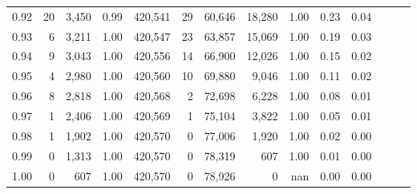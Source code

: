 \begin{tabular}{rrrrrrrrrrrrrr}
0.92 &     20 &  3,450 &  0.99 &  420,541 &       29 &  60,646 &  18,280 &  1.00 &  0.23 &      0.04 \\
0.93 &      6 &  3,211 &  1.00 &  420,547 &       23 &  63,857 &  15,069 &  1.00 &  0.19 &      0.03 \\
0.94 &      9 &  3,043 &  1.00 &  420,556 &       14 &  66,900 &  12,026 &  1.00 &  0.15 &      0.02 \\
0.95 &      4 &  2,980 &  1.00 &  420,560 &       10 &  69,880 &   9,046 &  1.00 &  0.11 &      0.02 \\
0.96 &      8 &  2,818 &  1.00 &  420,568 &        2 &  72,698 &   6,228 &  1.00 &  0.08 &      0.01 \\
0.97 &      1 &  2,406 &  1.00 &  420,569 &        1 &  75,104 &   3,822 &  1.00 &  0.05 &      0.01 \\
0.98 &      1 &  1,902 &  1.00 &  420,570 &        0 &  77,006 &   1,920 &  1.00 &  0.02 &      0.00 \\
0.99 &      0 &  1,313 &  1.00 &  420,570 &        0 &  78,319 &     607 &  1.00 &  0.01 &      0.00 \\
1.00 &      0 &    607 &  1.00 &  420,570 &        0 &  78,926 &       0 &   nan &  0.00 &      0.00 \\
\bottomrule
\end{tabular}
